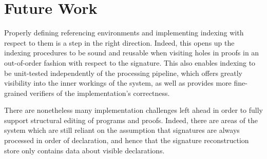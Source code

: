 \section{Future Work}

Properly defining referencing environments and implementing indexing with respect to them is a step in the right direction.
Indeed, this opens up the indexing procedures to be sound and reusable when visiting holes in \Harpoon proofs in an out-of-order fashion with respect to the \Beluga signature.
This also enables indexing to be unit-tested independently of the processing pipeline, which offers greatly visibility into the inner workings of the system, as well as provides more fine-grained verifiers of the implementation's correctness.

There are nonetheless many implementation challenges left ahead in order to fully support structural editing of \Beluga programs and \Harpoon proofs.
Indeed, there are areas of the system which are still reliant on the assumption that signatures are always processed in order of declaration, and hence that the signature reconstruction store only contains data about visible declarations.


